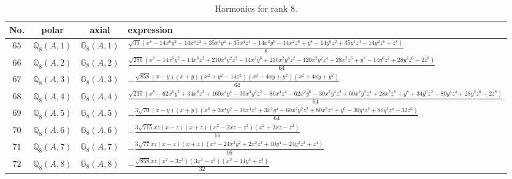 \documentclass[fleqn,8pt,landscape]{jsarticle}
\begin{document}
\begin{table}[ht!]
\begin{center}
\caption{Harmonics for rank 8.}
\renewcommand{\arraystretch}{1.3}
\begin{tabular}{cccl} \hline \hline
No. & polar & axial & expression \\ \hline
$ 65 $ & $ \mathbb{Q}_{8}(A,1) $ & $ \mathbb{G}_{8}(A,1) $ & $ \frac{\sqrt{33} \left(x^{8} - 14 x^{6} y^{2} - 14 x^{6} z^{2} + 35 x^{4} y^{4} + 35 x^{4} z^{4} - 14 x^{2} y^{6} - 14 x^{2} z^{6} + y^{8} - 14 y^{6} z^{2} + 35 y^{4} z^{4} - 14 y^{2} z^{6} + z^{8}\right)}{8} $ \\
$ 66 $ & $ \mathbb{Q}_{8}(A,2) $ & $ \mathbb{G}_{8}(A,2) $ & $ \frac{\sqrt{286} \left(x^{8} - 14 x^{6} y^{2} - 14 x^{6} z^{2} + 210 x^{4} y^{2} z^{2} - 14 x^{2} y^{6} + 210 x^{2} y^{4} z^{2} - 420 x^{2} y^{2} z^{4} + 28 x^{2} z^{6} + y^{8} - 14 y^{6} z^{2} + 28 y^{2} z^{6} - 2 z^{8}\right)}{64} $ \\
$ 67 $ & $ \mathbb{Q}_{8}(A,3) $ & $ \mathbb{G}_{8}(A,3) $ & $ - \frac{\sqrt{858} \left(x - y\right) \left(x + y\right) \left(x^{2} + y^{2} - 14 z^{2}\right) \left(x^{2} - 4 x y + y^{2}\right) \left(x^{2} + 4 x y + y^{2}\right)}{64} $ \\
$ 68 $ & $ \mathbb{Q}_{8}(A,4) $ & $ \mathbb{G}_{8}(A,4) $ & $ \frac{\sqrt{210} \left(x^{8} - 62 x^{6} y^{2} + 34 x^{6} z^{2} + 160 x^{4} y^{4} - 30 x^{4} y^{2} z^{2} - 80 x^{4} z^{4} - 62 x^{2} y^{6} - 30 x^{2} y^{4} z^{2} + 60 x^{2} y^{2} z^{4} + 28 x^{2} z^{6} + y^{8} + 34 y^{6} z^{2} - 80 y^{4} z^{4} + 28 y^{2} z^{6} - 2 z^{8}\right)}{64} $ \\
$ 69 $ & $ \mathbb{Q}_{8}(A,5) $ & $ \mathbb{G}_{8}(A,5) $ & $ - \frac{3 \sqrt{70} \left(x - y\right) \left(x + y\right) \left(x^{6} + 3 x^{4} y^{2} - 30 x^{4} z^{2} + 3 x^{2} y^{4} - 60 x^{2} y^{2} z^{2} + 80 x^{2} z^{4} + y^{6} - 30 y^{4} z^{2} + 80 y^{2} z^{4} - 32 z^{6}\right)}{64} $ \\
$ 70 $ & $ \mathbb{Q}_{8}(A,6) $ & $ \mathbb{G}_{8}(A,6) $ & $ - \frac{3 \sqrt{715} x z \left(x - z\right) \left(x + z\right) \left(x^{2} - 2 x z - z^{2}\right) \left(x^{2} + 2 x z - z^{2}\right)}{16} $ \\
$ 71 $ & $ \mathbb{Q}_{8}(A,7) $ & $ \mathbb{G}_{8}(A,7) $ & $ - \frac{3 \sqrt{77} x z \left(x - z\right) \left(x + z\right) \left(x^{4} - 24 x^{2} y^{2} + 2 x^{2} z^{2} + 40 y^{4} - 24 y^{2} z^{2} + z^{4}\right)}{16} $ \\
$ 72 $ & $ \mathbb{Q}_{8}(A,8) $ & $ \mathbb{G}_{8}(A,8) $ & $ - \frac{\sqrt{858} x z \left(x^{2} - 3 z^{2}\right) \left(3 x^{2} - z^{2}\right) \left(x^{2} - 14 y^{2} + z^{2}\right)}{32} $ \\

\end{tabular}
\end{center}
\end{table}
\end{document}
